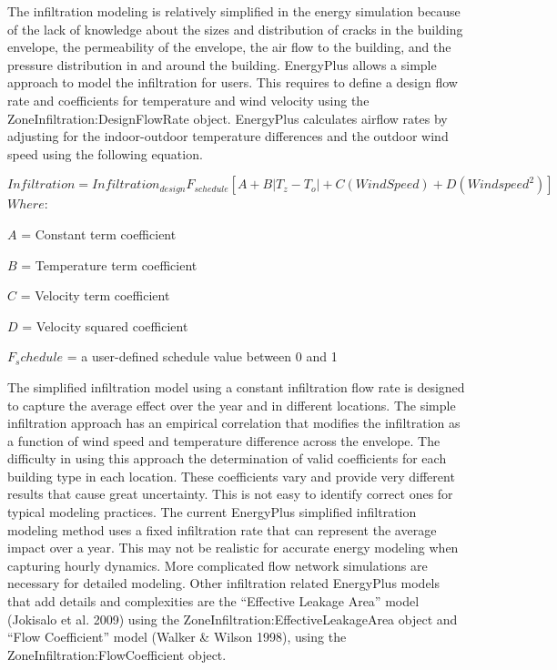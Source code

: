 The infiltration modeling is relatively simplified in the energy simulation because of the lack of knowledge about the sizes and distribution of cracks in the building envelope, the permeability of the envelope, the air flow to the building, and the pressure distribution in and around the building. EnergyPlus allows a simple approach to model the infiltration for users. This requires to define a design flow rate and coefficients for temperature and wind velocity using the ZoneInfiltration:DesignFlowRate object. EnergyPlus calculates airflow rates by adjusting for the indoor-outdoor temperature differences and the outdoor wind speed using the following equation.

\begin{equation}
Infiltration = Infiltration_{design} F_{schedule} [A+B|T_z −T_o|+C (WindSpeed)+D(Windspeed^2 )]
\end{equation}
$Where:$

$A$ = Constant term coefficient

$B$ = Temperature term coefficient

$C$ = Velocity term coefficient

$D$ = Velocity squared coefficient

$F_schedule$ = a user-defined schedule value between 0 and 1

The simplified infiltration model using a constant infiltration flow rate is designed to capture the average effect over the year and in different locations. The simple infiltration approach has an empirical correlation that modifies the infiltration as a function of wind speed and temperature difference across the envelope. The difficulty in using this approach the determination of valid coefficients for each building type in each location. These coefficients vary and provide very different results that cause great uncertainty. This is not easy to identify correct ones for typical modeling practices. The current EnergyPlus simplified infiltration modeling method uses a fixed infiltration rate that can represent the average impact over a year. This may not be realistic for accurate energy modeling when capturing hourly dynamics. More complicated flow network simulations are necessary for detailed modeling. Other infiltration related EnergyPlus models that add details and complexities are the “Effective Leakage Area” model (Jokisalo et al. 2009) using the ZoneInfiltration:EffectiveLeakageArea object  and “Flow Coefficient” model (Walker \& Wilson 1998), using the ZoneInfiltration:FlowCoefficient object.

